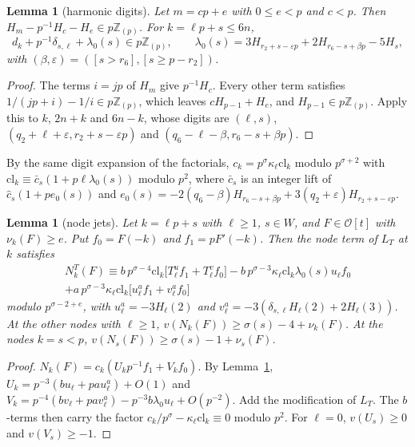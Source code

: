 \documentclass[11pt]{amsart}
\newtheorem{lemma}[theorem]{Lemma}
\theoremstyle{definition}
\theoremstyle{remark}
\numberwithin{equation}{section}
\newcommand{\Z}{\mathbb Z}
\newcommand{\cO}{\mathcal O}
\begin{document}
\begin{lemma}[harmonic digits]\label{lem:Hdig}
Let $m=cp+e$ with $0\le e<p$ and $c<p$. Then $H_m-p^{-1}H_c-H_e\in p\Z_{(p)}$. For $k=\ell p+s\le6n$,
\[
 d_k+p^{-1}\delta_{s,\ell}+\lambda_0(s)\in p\Z_{(p)},\qquad
 \lambda_0(s)=3H_{r_2+s-\varepsilon p}+2H_{r_6-s+\beta p}-5H_s,
\]
with $(\beta,\varepsilon)=([s>r_6],[s\ge p-r_2])$.
\end{lemma}

\begin{proof}
The terms $i=jp$ of $H_m$ give $p^{-1}H_c$. Every other term satisfies $1/(jp+i)-1/i\in p\Z_{(p)}$, which leaves
$cH_{p-1}+H_e$, and $H_{p-1}\in p\Z_{(p)}$. Apply this to $k$, $2n+k$ and $6n-k$, whose digits are $(\ell,s)$,
$(q_2+\ell+\varepsilon,r_2+s-\varepsilon p)$ and $(q_6-\ell-\beta,r_6-s+\beta p)$.
\end{proof}

By the same digit expansion of the factorials, $c_k=p^\sigma\kappa_\ell\mathrm{cl}_k$ modulo $p^{\sigma+2}$ with
$\mathrm{cl}_k\equiv\bar c_s(1+p\ell\lambda_0(s))$ modulo $p^2$, where $\bar c_s$ is an integer lift of
$\hat c_s(1+pe_0(s))$ and $e_0(s)=-2(q_6-\beta)H_{r_6-s+\beta p}+3(q_2+\varepsilon)H_{r_2+s-\varepsilon p}$.

\begin{lemma}[node jets]\label{lem:J}
Let $k=\ell p+s$ with $\ell\ge1$, $s\in W$, and $F\in\cO[t]$ with $\nu_k(F)\ge e$. Put $f_0=F(-k)$ and $f_1=pF'(-k)$.
Then the node term of $L_T$ at $k$ satisfies
\begin{multline*}
 N^T_k(F)\equiv b\,p^{\sigma-4}\mathrm{cl}_k\bigl[T^u_\ell f_1+T^v_\ell f_0\bigr]-b\,p^{\sigma-3}\kappa_\ell\mathrm{cl}_k\lambda_0(s)u_\ell f_0\\
 +a\,p^{\sigma-3}\kappa_\ell\mathrm{cl}_k\bigl[u^a_\ell f_1+v^a_\ell f_0\bigr]
\end{multline*}
modulo $p^{\sigma-2+e}$, with $u^a_\ell=-3H_\ell(2)$ and $v^a_\ell=-3(\delta_{s,\ell}H_\ell(2)+2H_\ell(3))$. At the other
nodes with $\ell\ge1$, $v(N_k(F))\ge\sigma(s)-4+\nu_k(F)$. At the nodes $k=s<p$, $v(N_s(F))\ge\sigma(s)-1+\nu_s(F)$.
\end{lemma}

\begin{proof}
$N_k(F)=c_k(U_kp^{-1}f_1+V_kf_0)$. By Lemma~\ref{lem:Hdig},
$U_k=p^{-3}(bu_\ell+pau^a_\ell)+O(1)$ and $V_k=p^{-4}(bv_\ell+pav^a_\ell)-p^{-3}b\lambda_0u_\ell+O(p^{-2})$. Add the
modification of $L_T$. The $b$-terms then carry the factor $c_k/p^\sigma-\kappa_\ell\mathrm{cl}_k\equiv0$ modulo $p^2$.
For $\ell=0$, $v(U_s)\ge0$ and $v(V_s)\ge-1$.
\end{proof}
\end{document}
